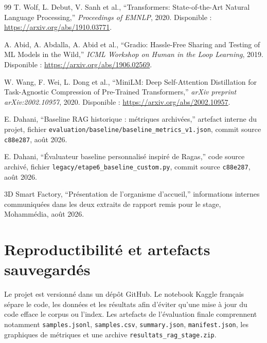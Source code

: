 \documentclass[12pt,a4paper,oneside]{report}
\begin{document}
\begin{thebibliography}{99}
T. Wolf, L. Debut, V. Sanh et al., ``Transformers: State-of-the-Art Natural
Language Processing,'' \textit{Proceedings of EMNLP}, 2020. Disponible :
\url{https://arxiv.org/abs/1910.03771}.

A. Abid, A. Abdalla, A. Abid et al., ``Gradio: Hassle-Free Sharing and Testing
of ML Models in the Wild,'' \textit{ICML Workshop on Human in the Loop Learning},
2019. Disponible : \url{https://arxiv.org/abs/1906.02569}.

W. Wang, F. Wei, L. Dong et al., ``MiniLM: Deep Self-Attention Distillation for
Task-Agnostic Compression of Pre-Trained Transformers,'' \textit{arXiv preprint
arXiv:2002.10957}, 2020. Disponible : \url{https://arxiv.org/abs/2002.10957}.

E. Dahani, ``Baseline RAG historique : métriques archivées,'' artefact interne
du projet, fichier \texttt{evaluation/baseline/baseline\_metrics\_v1.json},
commit source \texttt{c88e287}, août 2026.

E. Dahani, ``Évaluateur baseline personnalisé inspiré de Ragas,'' code source
archivé, fichier \texttt{legacy/etape6\_baseline\_custom.py}, commit source
\texttt{c88e287}, août 2026.

3D Smart Factory, ``Présentation de l'organisme d'accueil,'' informations
internes communiquées dans les deux extraits de rapport remis pour le stage,
Mohammédia, août 2026.

\end{thebibliography}

\appendix
\chapter{Reproductibilité et artefacts sauvegardés}

Le projet est versionné dans un dépôt GitHub. Le notebook Kaggle français
sépare le code, les données et les résultats afin d'éviter qu'une mise à jour du
code efface le corpus ou l'index. Les artefacts de l'évaluation finale comprennent
notamment \texttt{samples.jsonl}, \texttt{samples.csv}, \texttt{summary.json},
\texttt{manifest.json}, les graphiques de métriques et une archive
\texttt{resultats\_rag\_stage.zip}.
\end{document}
